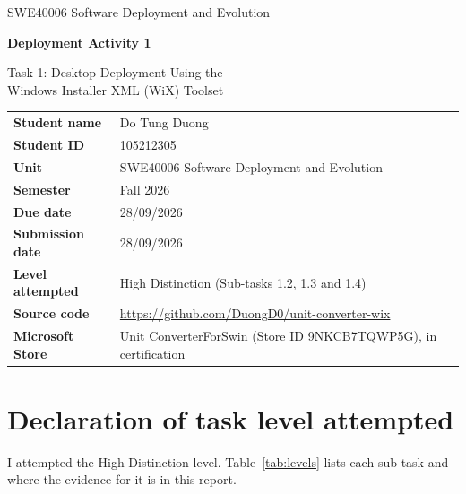 \documentclass[11pt,a4paper]{article}
\newcommand{\StudentName}{Do Tung Duong}
\newcommand{\StudentId}{105212305}
\newcommand{\Semester}{Fall 2026}
\newcommand{\DueDate}{28/09/2026}
\newcommand{\SubmissionDate}{28/09/2026}
\newcommand{\RepoUrl}{https://github.com/DuongD0/unit-converter-wix}
\begin{document}
\begin{titlepage}
  \centering
  \vspace*{2cm}
  {\Large SWE40006 Software Deployment and Evolution\par}
  \vspace{0.6cm}
  {\LARGE\bfseries Deployment Activity 1\par}
  \vspace{0.3cm}
  {\Large Task 1: Desktop Deployment Using the\\Windows Installer XML (WiX) Toolset\par}
  \vspace{1.5cm}

  \begin{tabular}{>{\bfseries}l l}
    \toprule
    Student name     & \StudentName \\
    Student ID       & \StudentId \\
    Unit             & SWE40006 Software Deployment and Evolution \\
    Semester         & \Semester \\
    Due date         & \DueDate \\
    Submission date  & \SubmissionDate \\
    Level attempted  & High Distinction (Sub-tasks 1.2, 1.3 and 1.4) \\
    Source code      & \url{\RepoUrl} \\
    Microsoft Store  & Unit ConverterForSwin (Store ID 9NKCB7TQWP5G), in certification \\
    \bottomrule
  \end{tabular}

  \vfill
\end{titlepage}

\tableofcontents
\newpage

\section{Declaration of task level attempted}

I attempted the High Distinction level. Table~\ref{tab:levels} lists each sub-task and where the
evidence for it is in this report.
\end{document}
